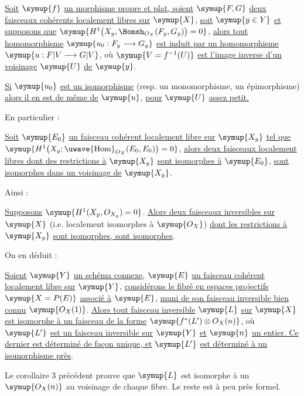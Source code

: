  \uline{Soit} $\symup{f}$ \uline{un morphisme propre et plat, soient} $\symup{F,G}$ \uline{deux
faisceaux cohérents localement libres sur} $\symup{X}$, \uline{soit} $\symup{y\in Y}$ \uline{et supposons que}
$\symup{H^1\bigl(X_y,\Homsh_{O_X}(F_y,G_y)\bigr)=0}$,
\uline{alors tout homomorphisme} $\symup{u_0:F_y\longrightarrow G_y}$ \uline{est induit par un
homomorphisme} $\symup{u:F|V\longrightarrow G|V}$, où $\symup{V=f^{-1}(U)}$ \uline{est l'image inverse d'un voisinage} $\symup{U}$ \uline{de} $\symup{y}$.

 \uline{Si} $\symup{u_0}$ \uline{est un isomorphisme} (resp. un monomorphisme, un
épimorphisme) \uline{alors il en est de même de} $\symup{u}$, \uline{pour} $\symup{U}$ \uline{assez petit.}

En particulier :

 \uline{Soit} $\symup{E_0}$ \uline{un faisceau cohérent localement libre sur}
$\symup{X_y}$ \uline{tel que}
$\symup{H^1\bigl(X_y;\mathop{\text{\uwave{Hom}}}\nolimits_{O_X}(E_0,E_0)\bigr)=0}$,
\uline{alors deux faisceaux localement libres dont des restrictions à} $\symup{X_y}$ \uline{sont
isomorphes à} $\symup{E_0}$, \uline{sont isomorphes dans un voisinage de} $\symup{X_y}$.

Ainsi :

 \uline{Supposons} $\symup{H^1(X_y,O_{X_y})=0}$. \uline{Alors deux faisceaux
inversibles sur} $\symup{X}$ (i.e. localement isomorphes à $\symup{O_X}$) \uline{dont les
restrictions à} $\symup{X_y}$ \uline{sont isomorphes, sont isomorphes}.

On en déduit :

 \uline{Soient} $\symup{Y}$ \uline{un schéma connexe}, $\symup{E}$ \uline{un faisceau cohérent localement libre sur} $\symup{Y}$, \uline{considérons le fibré en espaces projectifs}
$\symup{X=P(E)}$ \uline{associé à} $\symup{E}$, \uline{muni de son faisceau inversible bien connu}
$\symup{O_X(1)}$. \uline{Alors tout faisceau inversible} $\symup{L}$ \uline{sur} $\symup{X}$ \uline{est isomorphe à un
faisceau de la forme}
$\symup{f^*(L')\otimes O_X(n)}$,
où $\symup{L'}$ \uline{est un faisceau inversible sur} $\symup{Y}$ \uline{et} $\symup{n}$ \uline{un entier. Ce dernier est
déterminé de façon unique, et} $\symup{L'}$ \uline{est déterminé à un isomorphisme près}.

Le corollaire 3 précédent prouve que $\symup{L}$ est isomorphe à un $\symup{O_X(n)}$ au
voisinage de chaque fibre. Le reste est à peu près formel.

